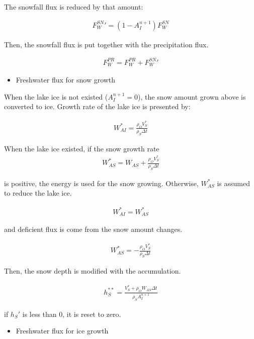 The snowfall flux is reduced by that amount:

\begin{eqnarray}
    {F_W^{SN}}' = (1-A_I^{n+1}) F_W^{SN}
\end{eqnarray}

Then, the snowfall flux is put together with the precipitation flux.

\begin{eqnarray}
    F_W^{PR} = F_W^{PR} + {F_W^{SN}}'
\end{eqnarray}

\begin{itemize}
\tightlist
\item
  Freshwater flux for snow growth
\end{itemize}

When the lake ice is not existed (\(A_I^{n+1}=0\)), the snow amount
grown above is converted to ice. Growth rate of the lake ice is
presented by:

\begin{eqnarray}
 W_{AI}^* =   \frac{\rho_O V_S^{*}}{\rho_S \Delta t}
\end{eqnarray}

When the lake ice existed, if the snow growth rate \begin{eqnarray}
    W_{AS}^* = W_{AS} +  \frac{\rho_O V_S^{*}}{\rho_S \Delta t}
\end{eqnarray}

is positive, the energy is used for the snow growing. Otherwise,
\(W_{AS}^*\) is assumed to reduce the lake ice.

\begin{eqnarray}
    W_{AI}^* = W_{AS}^*
\end{eqnarray}

and deficient flux is come from the snow amount changes.

\begin{eqnarray}
    W_{AS}^* = - \frac{\rho_O V_S^{*}}{\rho_S \Delta t}
\end{eqnarray}

Then, the snow depth is modified with the accumulation.

\begin{eqnarray}
    h_S^{**} = \frac{V_S^{*}+ \rho_O W_{AS} \Delta t}{\rho_S {A_I^{n+1}}}
\end{eqnarray}

if \(h_S'\) is less than 0, it is reset to zero.

\begin{itemize}
\tightlist
\item
  Freshwater flux for ice growth
\end{itemize}

